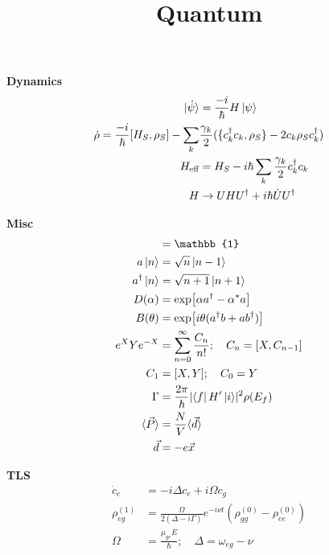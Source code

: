 \documentclass[12pt]{article}
\title{Quantum}
\date{}
\begin{document}
\maketitle

\begin{multicols}{2}

\textbf{Dynamics}
\begin{align}
  \ket*{\dot{\psi}} &= \frac{-i}{\hbar} H \ket{\psi}\\
  \dot{\rho} = \frac{-i}{\hbar} [H_S, \rho_S] - \sum_k &\frac{\gamma_k}{2} (\{c_k^{\dagger} c_k, \rho_S\} - 2 c_k \rho_S c_k^{\dagger})\\
  H_{\textrm{eff}} &= H_{S} - i \hbar \sum_k \frac{\gamma_k}{2} c_k^{\dagger} c_k\\
  H &\rightarrow UHU^{\dagger} + i \hbar\dot{U}U^{\dagger}
\end{align}

\textbf{Misc}
\begin{align}
  [a, a^{\dagger}] &= \mathbb{1}\\
  a \ket{n} &= \sqrt{n} \ket{n - 1}\\
  a^{\dagger} \ket{n} &= \sqrt{n + 1}\ket{n + 1}\\
  D(\alpha) &= \exp[\alpha a^{\dagger} - \alpha^{*} a]\\
  B(\theta) &= \exp[i\theta(a^{\dagger}b + ab^{\dagger})]\\
  e^{X} Y e^{-X} &= \sum_{n = 0}^{\infty} \frac{C_n}{n!}; \quad C_n = [X, C_{n - 1}]\\
  C_1 &= [X, Y]; \quad C_0 = Y\\
  \Gamma &= \frac{2\pi}{\hbar} \lvert \bra{f} H^{\prime} \ket{i} \rvert^2 \rho(E_f)\\
  \langle \vec{P} \rangle &= \frac{N}{V}\langle \vec{d} \rangle\\
  \vec{d} &= -e \vec{x}
\end{align}

  \textbf{TLS}
  \begin{align}
    \dot{c}_e &= -i \Delta c_e + i \Omega c_g\\
    \rho_{eg}^{(1)} &= \frac{\Omega}{2(\Delta - i\Gamma)}  e^{-i\nu t}
    (\rho_{gg}^{(0)} - \rho_{ee}^{(0)})\\
    \Omega &= \frac{\mu_{ge} E}{\hbar}; \quad \Delta = \omega_{eg} - \nu
  \end{align}


\end{multicols}
\end{document}
